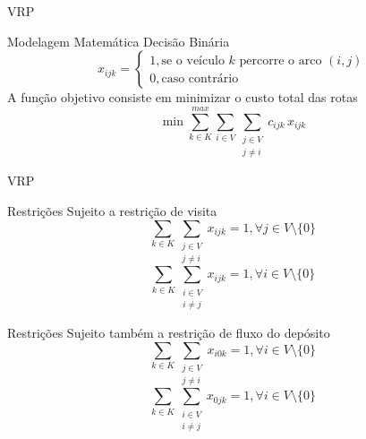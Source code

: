 \documentclass[xcolor={dvipsnames,table}]{beamer}
\begin{document}
\begin{frame}{VRP}
    \begin{block}{Modelagem Matemática}
        Decisão Binária
        $$
            x_{ijk}=\begin{cases}
                1, \text{se o veículo } k \text{ percorre o arco } (i,j) \\
                0, \text{caso contrário}
            \end{cases}
        $$
            A função objetivo consiste em minimizar o custo total das rotas %
            $$
                \min \sum_{k\in K}^{max}\sum_{i \in V} \sum_{\substack{j \in V \\ j \neq i}} c_{ijk}\, x_{ijk}
            $$
    \end{block}
\end{frame}


\begin{frame}{VRP}
    \begin{minipage}[c]{0.45\textwidth}
        \begin{block}{Restrições}
            Sujeito a restrição de visita 
            $$
            \sum_{k\in K}\sum_{\substack{j \in V \\ j \neq i}}x_{ijk}=1,\forall j\in V\setminus\{0\}
            $$
            $$
            \sum_{k\in K}\sum_{\substack{i \in V \\ i \neq j}}x_{ijk}=1,\forall i\in V\setminus\{0\}
            $$
        \end{block}
    \end{minipage}
    \hfill
    \begin{minipage}[c]{0.45\textwidth}
        \begin{block}{Restrições}
            Sujeito também a restrição de fluxo do depósito
            $$
                \sum_{k\in K}\sum_{\substack{j \in V \\ j \neq i}}x_{i0k}=1,\forall i\in V\setminus\{0\}
            $$
            $$
                \sum_{k\in K}\sum_{\substack{i \in V \\ i \neq j}}x_{0jk}=1,\forall i\in V\setminus\{0\}
            $$
        \end{block}
    \end{minipage}
\end{frame}
\end{document}

